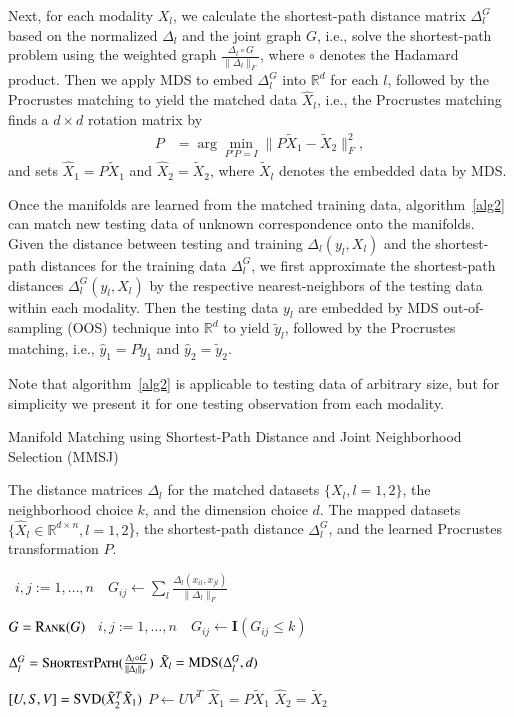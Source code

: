 \documentclass[times,twocolumn,final]{elsarticle}
\newcommand{\Linefor}[2]{%
    \State \algorithmicfor\ {#1}\ \algorithmicdo\ {#2} \algorithmicend\ \algorithmicfor%
}
\newcommand{\rto}{\leftarrow}
\providecommand{\mb}[1]{\boldsymbol{#1}}
\begin{document}
Next, for each modality $X_{l}$, we calculate the shortest-path distance matrix $\Delta_{l}^{G}$ based on the normalized $\Delta_{l}$ and the joint graph $G$, i.e., solve the shortest-path problem using the weighted graph $\frac{\Delta_{l} \circ G }{\|\Delta_{l}\|_{F}}$, where $\circ$ denotes the Hadamard product. Then we apply MDS to embed $\Delta_{l}^{G}$ into $\mathbb{R}^{d}$ for each $l$, followed by the Procrustes matching to yield the matched data $\hat{X}_{l}$, i.e., the Procrustes matching finds a $d \times d$ rotation matrix by
\begin{align*}
P&=\arg\min_{P'P=I} \|P \tilde{X}_{1}-\tilde{X}_{2}\|_{F}^{2},
\end{align*}
and sets $\hat{X}_{1}=P \tilde{X}_{1}$ and $\hat{X}_{2}=\tilde{X}_{2}$, where $\tilde{X}_{l}$ denotes the embedded data by MDS.

Once the manifolds are learned from the matched training data, algorithm~\ref{alg2} can match new testing data of unknown correspondence onto the manifolds. Given the distance between testing and training $\Delta_{l}(y_{l},X_{l})$ and the shortest-path distances for the training data $\Delta_{l}^{G}$, we first approximate the shortest-path distances $\Delta_{l}^{G}(y_{l},X_{l})$ by the respective nearest-neighbors of the testing data within each modality. Then the testing data $y_{l}$ are embedded by MDS out-of-sampling (OOS) technique into $\mathbb{R}^{d}$ to yield $\tilde{y}_{l}$, followed by the Procrustes matching, i.e., $\hat{y}_{1}=P \tilde{y}_{1}$ and $\hat{y}_{2}=\tilde{y}_{2}$.

Note that algorithm~\ref{alg2} is applicable to testing data of arbitrary size, but for simplicity we present it for one testing observation from each modality.

\begin{algorithm}
\caption{Manifold Matching using Shortest-Path Distance and Joint Neighborhood Selection (MMSJ)}
\label{alg1}
\begin{algorithmic}[1]
\Require The distance matrices $\Delta_{l}$ for the matched datasets $\{X_{l}, l=1,2\}$, the neighborhood choice $k$, and the dimension choice $d$.
\Ensure The mapped datasets $\{\hat{X}_{l} \in \mathbb{R}^{d \times n}, l=1,2$\}, the shortest-path distance $\Delta_{l}^{G}$, and the learned Procrustes transformation $P$.

\Linefor{$i,j:=1,\ldots,n$}{$G_{ij} \rto \sum_{l} \frac{\Delta_{l}(x_{il},x_{jl})}{\|\Delta_{l}\|_{F}}$} 
\State $G = \textsc{Rank}(G)$ 
\Linefor{$i,j:=1,\ldots,n$}{$G_{ij} \rto \mb{I}(G_{ij} \leq k)$} 
\State $\Delta_{l}^{G} = \textsc{ShortestPath}(\frac{\Delta_{l} \circ G }{\|\Delta_{l}\|_{F}})$ 
\State $\tilde{X}_{l}=\textsc{MDS}(\Delta_{l}^{G},d)$ 
\EndFor

\State $[U,S,V]=\textsc{SVD}(\tilde{X}_{2}^{T}\tilde{X}_{1})$
\State $P \rto UV^{T}$ 
\State $\hat{X}_{1}=P \tilde{X}_{1}$
\State $\hat{X}_{2}=\tilde{X}_{2}$
\EndFunction
\end{algorithmic}
\end{algorithm}
\end{document}
